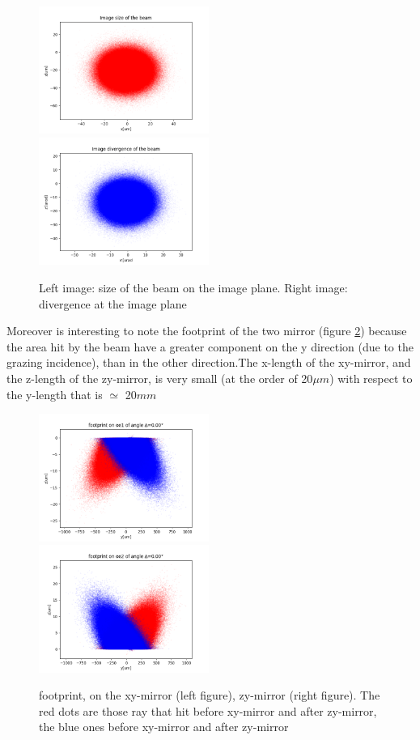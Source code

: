 \documentclass[a4paper]{article}
\begin{document}
\begin{figure}[H]
\centering
\includegraphics[width=0.495\textwidth]{image_spot.png}
\includegraphics[width=0.495\textwidth]{image_divergence.png}
\caption{\label{fig:image} Left image: size of the beam on the image plane. Right image: divergence at the image plane}
\end{figure}


Moreover is interesting to note the footprint of the two mirror (figure \ref{fig:footprint_oe1}) because the area hit by the beam have a greater component on the y direction (due to the grazing incidence), than in the other direction.The x-length of the xy-mirror, and the z-length of the zy-mirror, is very small (at the order of 20$\mu $$m$) with respect to the y-length that is $\simeq $ 20$mm$

\begin{figure}[H]
\centering
\includegraphics[width=0.495\textwidth]{footprint_oe1.png}
\includegraphics[width=0.495\textwidth]{footprint_oe2.png}
\caption{\label{fig:footprint_oe1} footprint, on the xy-mirror (left figure), zy-mirror (right figure). The red dots are those ray that hit before xy-mirror and after zy-mirror, the blue ones before xy-mirror and after zy-mirror}
\end{figure}
\end{document}

